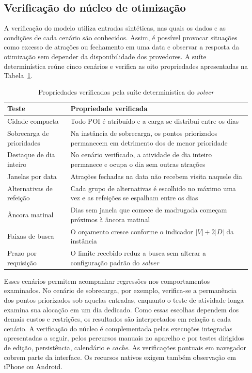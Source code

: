 \subsection{Verificação do núcleo de otimização}
\label{sec:verificacao-nucleo}

A verificação do modelo utiliza entradas sintéticas, nas quais os dados e as condições de cada cenário são conhecidos. Assim, é possível provocar situações como excesso de atrações ou fechamento em uma data e observar a resposta da otimização sem depender da disponibilidade dos provedores. A suíte determinística reúne cinco cenários e verifica as oito propriedades apresentadas na Tabela~\ref{tab:suite-solver}.

\begin{table}[H]
\centering
\small
\caption{Propriedades verificadas pela suíte determinística do \textit{solver}}
\label{tab:suite-solver}
\begin{tabularx}{\textwidth}{>{\raggedright\arraybackslash}p{4.2cm}>{\raggedright\arraybackslash}X}
\hline
\textbf{Teste} & \textbf{Propriedade verificada} \\
\hline
Cidade compacta & Todo POI é atribuído e a carga se distribui entre os dias \\
Sobrecarga de prioridades & Na instância de sobrecarga, os pontos priorizados permanecem em detrimento dos de menor prioridade \\
Destaque de dia inteiro & No cenário verificado, a atividade de dia inteiro permanece e ocupa o dia sem outras atrações \\
Janelas por data & Atrações fechadas na data não recebem visita naquele dia \\
Alternativas de refeição & Cada grupo de alternativas é escolhido no máximo uma vez e as refeições se espalham entre os dias \\
Âncora matinal & Dias sem janela que comece de madrugada começam próximos à âncora matinal \\
Faixas de busca & O orçamento cresce conforme o indicador $|V|+2|D|$ da instância \\
Prazo por requisição & O limite recebido reduz a busca sem alterar a configuração padrão do \textit{solver} \\
\hline
\end{tabularx}
\end{table}

Esses cenários permitem acompanhar regressões nos comportamentos examinados. No cenário de sobrecarga, por exemplo, verifica-se a permanência dos pontos priorizados sob aquelas entradas, enquanto o teste de atividade longa examina sua alocação em um dia dedicado. Como essas escolhas dependem dos demais custos e restrições, os resultados são interpretados em relação a cada cenário. A verificação do núcleo é complementada pelas execuções integradas apresentadas a seguir, pelos percursos manuais no aparelho e por testes dirigidos de edição, persistência, calendário e \textit{cache}. As verificações pontuais em navegador cobrem parte da interface. Os recursos nativos exigem também observação em iPhone ou Android.

